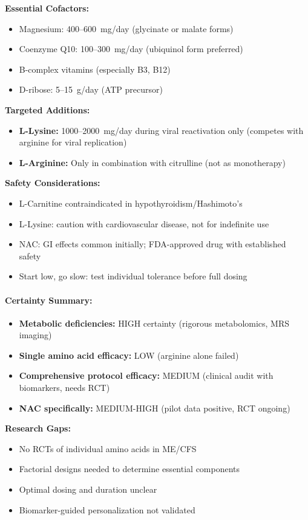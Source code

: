 \textbf{Essential Cofactors:}
\begin{itemize}
    \item Magnesium: 400--600~mg/day (glycinate or malate forms)
    \item Coenzyme Q10: 100--300~mg/day (ubiquinol form preferred)
    \item B-complex vitamins (especially B3, B12)
    \item D-ribose: 5--15~g/day (ATP precursor)
\end{itemize}

\textbf{Targeted Additions:}
\begin{itemize}
    \item \textbf{L-Lysine:} 1000--2000~mg/day during viral reactivation only (competes with arginine for viral replication)
    \item \textbf{L-Arginine:} Only in combination with citrulline (not as monotherapy)
\end{itemize}

\textbf{Safety Considerations:}
\begin{itemize}
    \item L-Carnitine contraindicated in hypothyroidism/Hashimoto's
    \item L-Lysine: caution with cardiovascular disease, not for indefinite use
    \item NAC: GI effects common initially; FDA-approved drug with established safety
    \item Start low, go slow: test individual tolerance before full dosing
\end{itemize}

\paragraph{Certainty Summary:}
\begin{itemize}
    \item \textbf{Metabolic deficiencies:} HIGH certainty (rigorous metabolomics, MRS imaging)
    \item \textbf{Single amino acid efficacy:} LOW (arginine alone failed)
    \item \textbf{Comprehensive protocol efficacy:} MEDIUM (clinical audit with biomarkers, needs RCT)
    \item \textbf{NAC specifically:} MEDIUM-HIGH (pilot data positive, RCT ongoing)
\end{itemize}

\textbf{Research Gaps:}
\begin{itemize}
    \item No RCTs of individual amino acids in ME/CFS
    \item Factorial designs needed to determine essential components
    \item Optimal dosing and duration unclear
    \item Biomarker-guided personalization not validated
\end{itemize}


